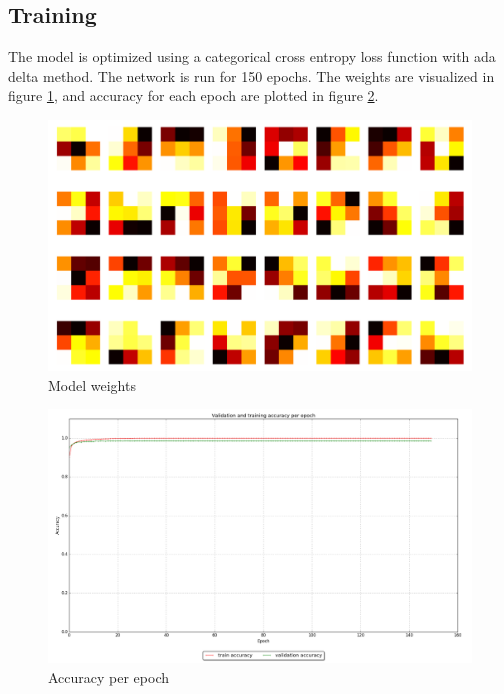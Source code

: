 \documentclass[paper=a4, fontsize=11pt]{scrartcl} %
\begin{document}
    \subsection*{Training}
    The model is optimized using a categorical cross entropy loss function with ada delta method. The network is run for 150 epochs. The weights are visualized in figure \ref{fig:weights}, and accuracy for each epoch are plotted in figure \ref{fig:train}.
    \begin{figure}[H]
        \begin{center}
            \includegraphics[width=1.0\linewidth]{images/mnist_weights.png}
            \caption{Model weights}
            \label{fig:weights}
        \end{center}
    \end{figure}
    \begin{figure}[H]
        \begin{center}
            \includegraphics[width=1.0\linewidth]{images/mnist_training_log.png}
            \caption{Accuracy per epoch}
            \label{fig:train}
        \end{center}
    \end{figure}
\end{document}
